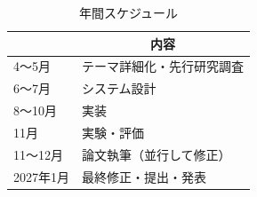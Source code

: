 \documentclass[a4paper,12pt]{ujarticle}
\newcommand{\thc}[1]{\multicolumn{1}{c|}{#1}}
\begin{document}
\begin{table}[H]
  \caption{年間スケジュール}\label{tab:yearlyschedule}
  \centering
  \begin{tabular}{|p{30mm}||p{30mm}|}\hline
        & \thc{内容} \\ \hline\hline
     4～5月  & テーマ詳細化・先行研究調査 \\ \hline
     6～7月  & システム設計 \\ \hline
     8～10月  & 実装 \\ \hline
     11月  & 実験・評価 \\ \hline
     11～12月  & 論文執筆（並行して修正） \\ \hline
     2027年1月  & 最終修正・提出・発表 \\ \hline
  \end{tabular}
\end{table}
\end{document}
